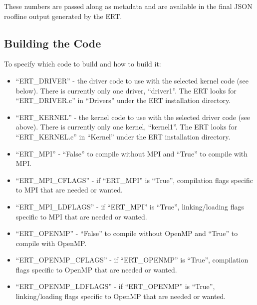 These numbers are passed along as metadata and are available in the final JSON
roofline output generated by the ERT.

\subsection{Building the Code}
To specify which code to build and how to build it:

\begin{itemize}

\vspace{-0.1in}
\item{``ERT\_\+DRIVER'' - the driver code to use with the selected kernel code
(see below).  There is currently only one driver, ``driver1''.  The ERT looks
for ``ERT\_\+DRIVER.c'' in ``Drivers'' under the ERT installation directory.}

\vspace{-0.1in}
\item{``ERT\_\+KERNEL'' - the kernel code to use with the selected driver code
(see above).  There is currently only one kernel, ``kernel1''.  The ERT looks
for ``ERT\_\+KERNEL.c'' in ``Kernel'' under the ERT installation directory.}

\vspace{-0.1in}
\item{``ERT\_\+MPI'' - ``False'' to compile without MPI and ``True'' to compile
with MPI.}

\vspace{-0.1in}
\item{``ERT\_\+MPI\_\+CFLAGS'' - if ``ERT\_\+MPI'' is ``True'', compilation flags
specific to MPI that are needed or wanted.}

\vspace{-0.1in}
\item{``ERT\_\+MPI\_\+LDFLAGS'' - if ``ERT\_\+MPI'' is ``True'', linking/loading flags
specific to MPI that are needed or wanted.}

\vspace{-0.1in}
\item{``ERT\_\+OPENMP'' - ``False'' to compile without OpenMP and ``True'' to
compile with OpenMP.}

\vspace{-0.1in}
\item{``ERT\_\+OPENMP\_\+CFLAGS'' - if ``ERT\_\+OPENMP'' is ``True'',
compilation flags specific to OpenMP that are needed or wanted.}

\vspace{-0.1in}
\item{``ERT\_\+OPENMP\_\+LDFLAGS'' - if ``ERT\_\+OPENMP'' is ``True'',
linking/loading flags specific to OpenMP that are needed or wanted.}


\end{itemize}
